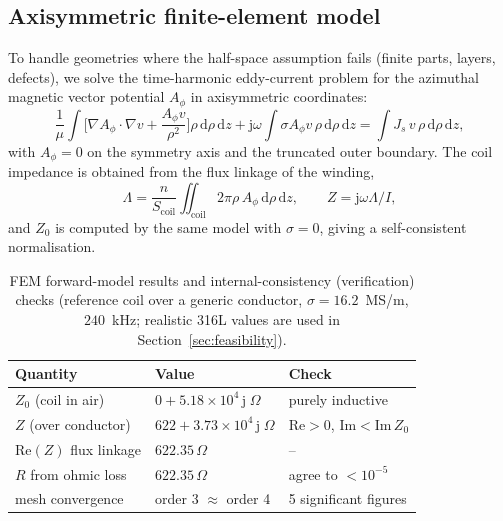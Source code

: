 \documentclass[11pt]{article}
\begin{document}
\subsection{Axisymmetric finite-element model}
To handle geometries where the half-space assumption fails (finite parts, layers,
defects), we solve the time-harmonic eddy-current problem for the azimuthal
magnetic vector potential $A_\phi$ in axisymmetric coordinates:
\begin{equation}
  \frac{1}{\mu}\!\int\!\Big[\nabla A_\phi\!\cdot\!\nabla v
  + \frac{A_\phi v}{\rho^2}\Big]\rho\,\mathrm{d}\rho\,\mathrm{d}z
  + \mathrm{j}\omega\!\int\!\sigma A_\phi v\,\rho\,\mathrm{d}\rho\,\mathrm{d}z
  = \int J_s\, v\,\rho\,\mathrm{d}\rho\,\mathrm{d}z,
  \label{eq:weak}
\end{equation}
with $A_\phi=0$ on the symmetry axis and the truncated outer boundary. The coil
impedance is obtained from the flux linkage of the winding,
\begin{equation}
  \Lambda = \frac{n}{S_{\mathrm{coil}}}\!\iint_{\mathrm{coil}}\! 2\pi\rho\,A_\phi\,
  \mathrm{d}\rho\,\mathrm{d}z, \qquad Z=\mathrm{j}\omega\Lambda/I,
  \label{eq:flux}
\end{equation}
and $Z_0$ is computed by the same model with $\sigma=0$, giving a self-consistent
normalisation.

\begin{table}[t]
\centering
\caption{FEM forward-model results and internal-consistency (verification)
checks (reference coil over a generic conductor, $\sigma=16.2$~MS/m, $240$~kHz;
realistic 316L values are used in Section~\ref{sec:feasibility}).}
\label{tab:fem}
\begin{tabular}{lll}
\toprule
Quantity & Value & Check\\
\midrule
$Z_0$ (coil in air)        & $0 + 5.18\times10^4\,\mathrm{j}\;\Omega$ & purely inductive\\
$Z$ (over conductor)       & $622 + 3.73\times10^4\,\mathrm{j}\;\Omega$ & $\mathrm{Re}>0$, $\mathrm{Im}<\mathrm{Im}\,Z_0$\\
$\mathrm{Re}(Z)$ flux linkage & $622.35\,\Omega$ & --\\
$R$ from ohmic loss        & $622.35\,\Omega$ & agree to $<10^{-5}$\\
mesh convergence           & order 3 $\approx$ order 4 & 5 significant figures\\
\bottomrule
\end{tabular}
\end{table}
\end{document}
